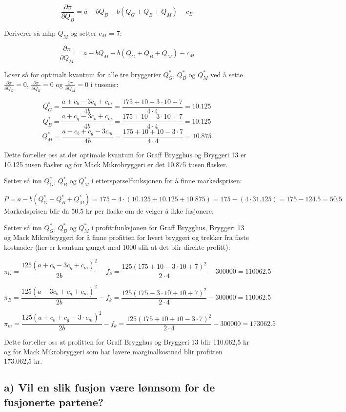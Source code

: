 \documentclass[
  12pt,
  a4paper,
  DIV=11,
  numbers=noendperiod]{scrartcl}
\begin{document}
\[\frac{\partial \pi}{\partial Q_B} = a - bQ_B - b(Q_G+Q_B+Q_M) -c_B \tag{20}\]

Deriverer så mhp \(Q_M\) og setter \(c_M\) = 7:

\[\frac{\partial \pi}{\partial Q_M} = a - bQ_M - b(Q_G+Q_B+Q_M) -c_M \tag{21}\]

Løser så for optimalt kvantum for alle tre bryggerier \(Q_G^*\),
\(Q_B^*\) og \(Q_M^*\) ved å sette
\(\frac{\partial \pi}{\partial Q_G} = 0\),
\(\frac{\partial \pi}{\partial Q_B} = 0\) og
\(\frac{\partial \pi}{\partial Q_M} = 0\) i tusener:

\[Q_G^* = \frac{a + c_b -3 c_g+c_m }{4b} = \frac{175 + 10 -3 \cdot 10+7 }{4 \cdot4} = 10.125 \tag{22}\]
\[Q_B^* = \frac{a + c_g -3 c_b+c_m }{4b} = \frac{175 + 10 -3 \cdot 10+7 }{4 \cdot4} = 10.125 \tag{23}\]
\[Q_M^* = \frac{a + c_b  +c_g-3c_m}{4b} = \frac{175 + 10 +10-3 \cdot 7 }{4 \cdot4} = 10.875 \tag{24}\]

Dette forteller oss at det optimale kvantum for Graff Brygghus og
Bryggeri 13 er 10.125 tusen flasker og for Mack Mikrobryggeri er det
10.875 tusen flasker.

Setter så inn \(Q_G^*\), \(Q_B^*\) og \(Q_M^*\) i etterspørselfunksjonen
for å finne markedsprisen:

\[P = a - b(Q_G^*+Q_B^*+Q_M^*) = 175 - 4 \cdot (10.125+10.125+10.875) = 175 - (4 \cdot 31.125)  = 175 - 124.5 = 50.5 \tag{25}\]
Markedsprisen blir da 50.5 kr per flaske om de velger å ikke fusjonere.

Setter så inn \(Q_G^*\), \(Q_B^*\) og \(Q_M^*\) i profittfunksjonen for
Graff Brygghus, Bryggeri 13 og Mack Mikrobryggeri for å finne profitten
for hvert bryggeri og trekker fra faste kostnader (her er kvantum ganget
med 1000 slik at det blir direkte profitt):

\[ \pi_G = \frac{125(a+c_b-3c_g+c_m)^2}{2b} -f_k = \frac{125(175+10-3 \cdot 10+7)^2}{2 \cdot 4} -300000 = 110062.5 \tag{26}\]

\[ \pi_B = \frac{125(a-3c_b+c_g+c_m)^2}{2b} -f_k = \frac{125(175-3 \cdot 10+10+7)^2}{2 \cdot 4} -300000 = 110062.5 \tag{27}\]

\[ \pi_m = \frac{125(a+c_b+c_g-3 \cdot c_m)^2}{2b} -f_k = \frac{125(175+10+10-3 \cdot 7)^2}{2 \cdot 4} -300000 = 173062.5 \tag{28}\]

Dette forteller oss at profitten for Graff Brygghus og Bryggeri 13 blir
110.062,5 kr og for Mack Mikrobryggeri som har lavere marginalkostnad
blir profitten 173.062,5 kr.

\subsection{a) Vil en slik fusjon være lønnsom for de fusjonerte
partene?}\label{a-vil-en-slik-fusjon-vuxe6re-luxf8nnsom-for-de-fusjonerte-partene}
\end{document}
